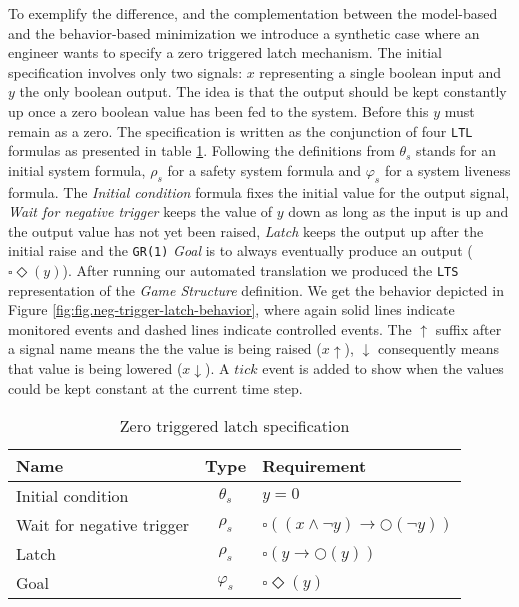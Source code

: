 To exemplify the difference, and the complementation between the model-based
and the behavior-based minimization we introduce a synthetic case where an engineer
wants to specify a zero triggered latch mechanism. The initial specification
involves only two signals: $x$ representing a single boolean input and $y$ the only
boolean output.  The idea is that the output should be kept constantly up 
once a zero boolean value has been fed to the system.
Before this $y$ must remain as a zero.  
The specification is written as the conjunction of four \texttt{LTL} \cite{pnueli1977temporal}
formulas as presented in table \ref{table:d-ff-spec}. 
Following the definitions from \cite{DBLP:conf/vmcai/PitermanPS06} $\theta_s$ stands for
an initial system formula, $\rho_s$ for a safety system formula and 
$\varphi_s$ for a system liveness formula.
The \textit{Initial condition} formula 
fixes the initial value for the output signal,
\textit{Wait for negative trigger} keeps the value of $y$ down as long as the input
is up and the output value has not yet been raised, \textit{Latch} keeps the 
output up after the initial raise and the \texttt{GR(1)} \textit{Goal} is to 
always eventually produce an output ($\square\Diamond(y)$).  After running our automated
translation we produced the \texttt{LTS} representation of the \textit{Game Structure}
definition.  We get the behavior depicted in Figure \ref{fig:fig.neg-trigger-latch-behavior},
where again solid lines indicate monitored events and dashed lines indicate controlled events.
The $\uparrow$ suffix after a signal name means the the value is being raised ($x\uparrow$),
$\downarrow$ consequently means that value is being lowered ($x\downarrow$).  A $tick$ event
is added to show when the values could be kept constant at the current time step.
\begin{center}
\begin{table}[h]
  \begin{tabular}{ l  c  l }
	Name & Type & Requirement \\
    \hline
    Initial condition & $\theta_s$ & $y = 0$\\
    Wait for negative trigger & $\rho_s$ &$\square((x \wedge \neg y) \rightarrow \Circle(\neg y) )$ \\
    Latch & $\rho_s$ &$\square (y \rightarrow \Circle(y))$ \\   
    Goal &  $\varphi_s$ & $\square\Diamond(y)$\\
  \end{tabular}
  \caption{Zero triggered latch specification}
  \label{table:d-ff-spec}
 \end{table}
\end{center}
